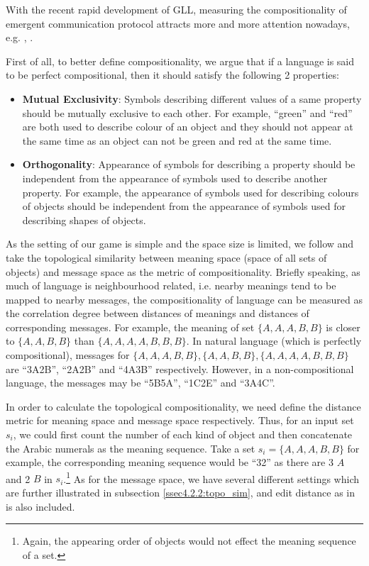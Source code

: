 With the recent rapid development of GLL, measuring the compositionality of emergent communication protocol attracts more and more attention nowadays, e.g. \cite{andreas2019measuring}, \cite{lowe2019pitfalls}.

First of all, to better define compositionality, we argue that if a language is said to be perfect compositional, then it should satisfy the following 2 properties:

\begin{itemize}
    \item \textbf{Mutual Exclusivity}: Symbols describing different values of a same property should be mutually exclusive to each other. For example, ``green'' and ``red'' are both used to describe colour of an object and they should not appear at the same time as an object can not be green and red at the same time.
    \item \textbf{Orthogonality}: Appearance of symbols for describing a property should be independent from the appearance of symbols used to describe another property. For example, the appearance of symbols used for describing colours of objects should be independent from the appearance of symbols used for describing shapes of objects.
\end{itemize}

As the setting of our game is simple and the space size is limited, we follow \cite{brighton2006understanding} and take the topological similarity between meaning space (space of all sets of objects) and message space as the metric of compositionality. Briefly speaking, as much of language is neighbourhood related, i.e. nearby meanings tend to be mapped to nearby messages, the compositionality of language can be measured as the correlation degree between distances of meanings and distances of corresponding messages. For example, the meaning of set $\{A,A,A,B,B\}$ is closer to $\{A,A,B,B\}$ than $\{A,A,A,A,B,B,B\}$. In natural language (which is perfectly compositional), messages for  $\{A,A,A,B,B\}, \{A,A,B,B\}, \{A,A,A,A,B,B,B\}$ are ``3A2B'', ``2A2B'' and ``4A3B'' respectively. However, in a non-compositional language, the messages may be ``5B5A'', ``1C2E'' and ``3A4C''.

In order to calculate the topological compositionality, we need define the distance metric for meaning space and message space respectively. Thus, for an input set $s_i$, we could first count the number of each kind of object and then concatenate the Arabic numerals as the meaning sequence. Take a set $s_i=\{A, A, A, B, B\}$ for example, the corresponding meaning sequence would be ``32'' as there are 3 $A$ and 2 $B$ in $s_i$.\footnote{Again, the appearing order of objects would not effect the meaning sequence of a set.} As for the message space, we have several different settings which are further illustrated in subsection \ref{ssec4.2.2:topo_sim}, and edit distance as in \cite{brighton2006understanding} is also included.

